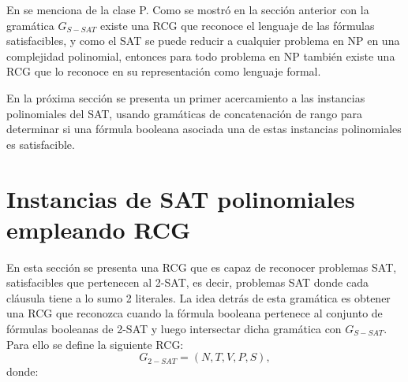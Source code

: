\documentclass[12pt]{article}
\begin{document}
En \cite{mainRCGBib} se menciona  de la clase P. Como se mostró en la sección anterior con la gramática $G_{S-SAT}$ existe una RCG que reconoce el lenguaje de las fórmulas satisfacibles, y como el SAT se puede reducir a cualquier problema en NP en una complejidad polinomial, entonces para todo problema en NP también existe una RCG que lo reconoce en su representación como lenguaje formal.

En la próxima sección se presenta un primer acercamiento a las instancias polinomiales del SAT, usando gramáticas de concatenación de rango
para determinar si una fórmula booleana asociada una de estas instancias polinomiales es satisfacible.

\section{Instancias de SAT polinomiales empleando RCG}

En esta sección se presenta una RCG que es capaz de reconocer problemas SAT, satisfacibles que pertenecen al 2-SAT, es decir, problemas SAT donde cada cláusula tiene a lo sumo 2 literales. La idea detrás de esta gramática es obtener una RCG que reconozca cuando la fórmula booleana pertenece al conjunto de fórmulas booleanas de 2-SAT y luego intersectar dicha gramática con $G_{S-SAT}$.  Para ello se define la siguiente RCG:
\[
    G_{2-SAT} = (N, T, V, P, S),
\]
donde:
\end{document}
